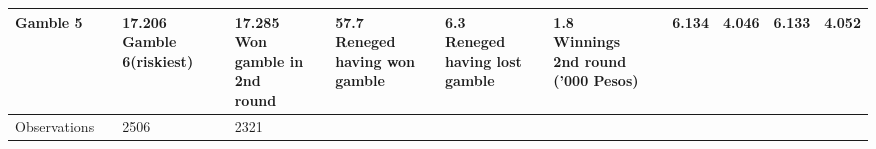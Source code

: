 \documentclass[]{article}
\begin{document}
\begin{table}[H]
\begin{tabular}{l|>{\em}l|l|>{}l||l|l}
\hline
\hspace{1em}Gamble 5 &  & 17.206%
\hline
\hspace{1em}Gamble 6(riskiest) &  & 17.285%
\hline
Won gamble in 2nd round &  & 57.7%
\hline
Reneged having won gamble &  & 6.3%
\hline
Reneged having lost gamble &  & 1.8%
\hline
Winnings 2nd round ('000 Pesos) &  & 6.134 & 4.046 & 6.133 & 4.052\\
\hline
Observations &  & 2506 &  & 2321 & \\
\hline
\end{tabular}
\endgroup{}
\end{table}
\end{document}
